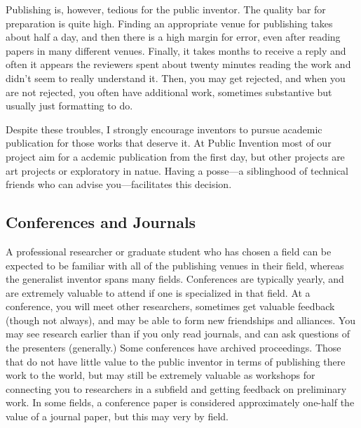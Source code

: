 \documentclass[
	fontsize=10pt, %
	twoside=false, %
	secnumdepth=1, %
]{kaobook}
\begin{document}
Publishing is, however, tedious for the public inventor.
The quality bar for preparation is quite high.
Finding an appropriate venue for publishing takes about half a day, and
then there is a high margin for error, even after reading papers in many
different venues.
Finally, it takes months to receive a reply and often it appears
the reviewers spent about twenty minutes reading the work and didn't seem
to really understand it.
Then, you may get rejected, and when you are not rejected, you often
have additional work, sometimes substantive but usually just formatting to do.

Despite these troubles, I strongly encourage inventors to pursue
academic publication for those works that deserve it. At Public Invention
most of our project aim for a acdemic publication from the first day,
but other projects are art projects or exploratory in natue.
Having a posse---a siblinghood of technical friends who can advise you---facilitates this decision.

\subsection{Conferences and Journals}

A professional researcher or graduate student who has chosen a field can be expected to be familiar
with all of the publishing venues in their field, whereas the generalist inventor spans many fields.
Conferences are typically yearly, and are extremely valuable to attend if one is specialized in that
field. At a conference, you will meet other researchers, sometimes get valuable feedback (though
not always), and may be able to form new friendships and alliances. You may see research earlier
than if you only read journals, and can ask questions of the presenters (generally.)
Some conferences have archived proceedings. Those that do not have little value
to the public inventor in terms of publishing there work to the world, but may still
be extremely valuable as workshops for connecting you to researchers in a subfield and
getting feedback on preliminary work. In some fields, a conference paper is considered
approximately one-half the value of a journal paper, but this may very by field.
\end{document}
